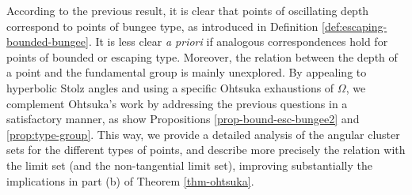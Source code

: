 \documentclass[11pt,a4paper,reqno]{amsart}
\theoremstyle{plain}
\theoremstyle{definition}
\newtheorem{obs}[thm]{Remark}
\theoremstyle{plain}
\begin{document}

According to the previous result, it is clear that points of oscillating depth correspond to points of bungee type, as introduced in Definition \ref{def:escaping-bounded-bungee}. It is less clear {\em a priori} if analogous correspondences hold for points of bounded or escaping type. Moreover, the relation between the depth of a point and the fundamental group is mainly unexplored. By appealing to hyperbolic Stolz angles and using a specific Ohtsuka exhaustions of $\Omega$, we  complement Ohtsuka's work by addressing the previous questions in a satisfactory manner, as show Propositions \ref{prop-bound-esc-bungee2} and \ref{prop:type-group}. This way, we provide a detailed analysis of the angular cluster sets for the different types of points, and describe more precisely the relation with the limit set (and the non-tangential limit set),  improving substantially the implications in part (b) of Theorem \ref{thm-ohtsuka}. 
\end{document}
